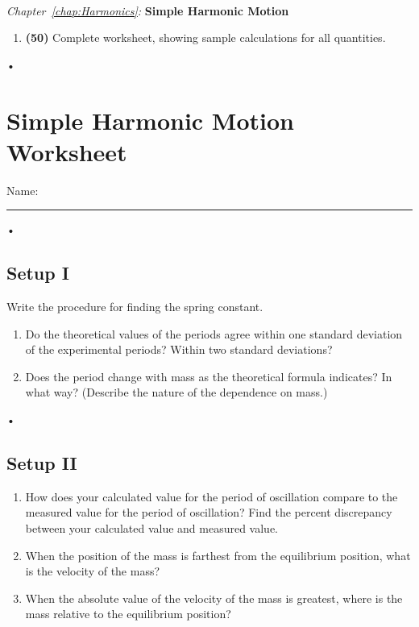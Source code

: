 \documentclass[main.tex]{subfiles}
\begin{document}
\begin{samepage}
\hrulefill \\
\emph{Chapter~\ref{chap:Harmonics}:} \textbf{Simple Harmonic Motion}
\begin{enumerate}
\item
\textbf{(50)} Complete worksheet, showing sample calculations for all quantities.
\end{enumerate}•
\end{samepage}

\newpage
\section{Simple Harmonic Motion Worksheet}
\begin{flushright}
Name:\rule[-1mm]{5cm}{.1pt}
\end{flushright}•

\subsection*{Setup I}


Write the procedure for finding the spring constant.
\\[10cm]

\begin{enumerate}
\item
Do the theoretical values of the periods agree within one standard deviation of the experimental periods? Within two standard deviations?
\\[2cm]

\item
Does the period change with mass as the theoretical formula indicates? In what way? (Describe the nature of the dependence on mass.)
\end{enumerate}•
\newpage

\subsection*{Setup II}

\begin{enumerate}
\item
How does your calculated value for the period of oscillation compare to the measured value for the period of oscillation? Find the percent discrepancy between your calculated value and measured value.
\\[3cm]

\item
When the position of the mass is farthest from the equilibrium position, what is the velocity of the mass?
\\[3cm]

\item
When the absolute value of the velocity of the mass is greatest, where is the mass relative to the equilibrium position?
\end{enumerate}
\newpage
\end{document}
